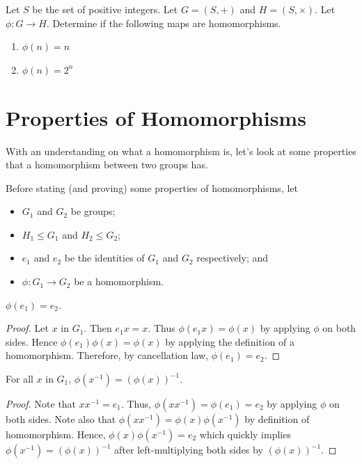 \begin{exercise}
    Let $S$ be the set of positive integers. Let $G = (S, +)$ and $H = (S, \times)$. Let $\phi: G \to H$. Determine if the following maps are homomorphisms.
    \begin{enumerate}[label=(\alph*)]
        \item $\phi(n) = n$
        \item $\phi(n) = 2^n$
    \end{enumerate}
\end{exercise}

\newpage

\section{Properties of Homomorphisms}
With an understanding on what a homomorphism is, let's look at some properties that a homomorphism between two groups has.

Before stating (and proving) some properties of homomorphisms, let
\begin{itemize}
    \item $G_1$ and $G_2$ be groups;
    \item $H_1 \leq G_1$ and $H_2 \leq G_2$;
    \item $e_1$ and $e_2$ be the identities of $G_1$ and $G_2$ respectively; and
    \item $\phi: G_1 \to G_2$ be a homomorphism.
\end{itemize}

\begin{proposition}
    $\phi(e_1) = e_2$.
\end{proposition}
\begin{proof}
    Let $x$ in $G_1$. Then $e_1x = x$. Thus $\phi(e_1x) = \phi(x)$ by applying $\phi$ on both sides. Hence $\phi(e_1)\phi(x) = \phi(x)$ by applying the definition of a homomorphism. Therefore, by cancellation law, $\phi(e_1) = e_2$.
\end{proof}

\begin{proposition}
    For all $x$ in $G_1$, $\phi(x^{-1}) = \left(\phi(x)\right)^{-1}$.
\end{proposition}
\begin{proof}
    Note that $xx^{-1} = e_1$. Thus, $\phi(xx^{-1}) = \phi(e_1) = e_2$ by applying $\phi$ on both sides. Note also that $\phi(xx^{-1}) = \phi(x)\phi(x^{-1})$ by definition of homomorphism. Hence, $\phi(x)\phi(x^{-1}) = e_2$ which quickly implies $\phi(x^{-1}) = \left(\phi(x)\right)^{-1}$ after left-multiplying both sides by $\left(\phi(x)\right)^{-1}$.
\end{proof}

